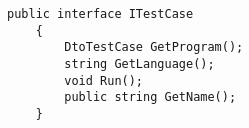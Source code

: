 

\begin{lstlisting}[caption=The interface used to implement the test cases, label={lst:test_case}]
    public interface ITestCase
    {
        DtoTestCase GetProgram();
        string GetLanguage();
        void Run();
        public string GetName();
    }
\end{lstlisting}